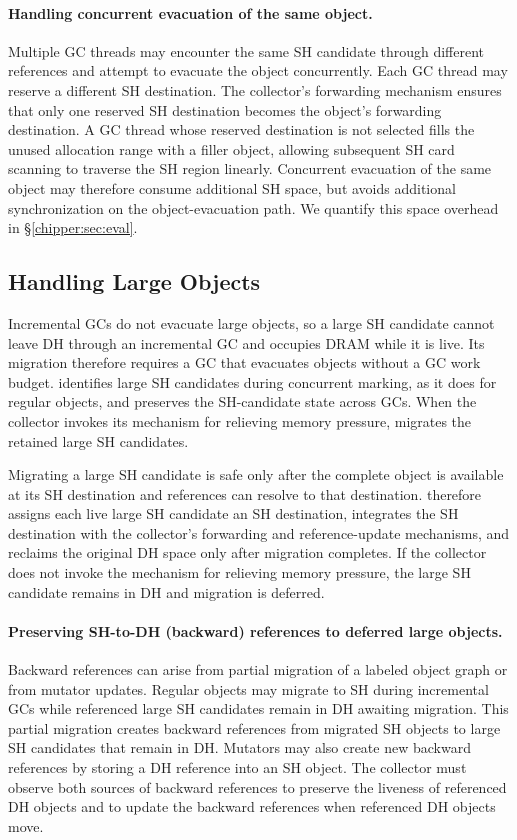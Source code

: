 \paragraph{\textbf{Handling concurrent evacuation of the same object.}}
Multiple GC threads may encounter the same SH candidate through different references and attempt to evacuate the object concurrently.
Each GC thread may reserve a different SH destination.
The collector's forwarding mechanism ensures that only one reserved SH destination becomes the object's forwarding destination.
A GC thread whose reserved destination is not selected fills the unused allocation range with a filler object, allowing subsequent SH card scanning to traverse the SH region linearly.
Concurrent evacuation of the same object may therefore consume additional SH space, but avoids additional synchronization on the object-evacuation path.
We quantify this space overhead in \S\ref{chipper:sec:eval}.

\subsection{Handling Large Objects}
\label{sec:nonmovable}

Incremental GCs do not evacuate large objects, so a large SH candidate cannot leave DH through an incremental GC and occupies DRAM while it is live.
Its migration therefore requires a GC that evacuates objects without a GC work budget.
\chipperName{} identifies large SH candidates during concurrent marking, as it does for regular objects, and preserves the SH-candidate state across GCs.
When the collector invokes its mechanism for relieving memory pressure, \chipperName{} migrates the retained large SH candidates.

Migrating a large SH candidate is safe only after the complete object is available at its SH destination and references can resolve to that destination.
\chipperName{} therefore assigns each live large SH candidate an SH destination, integrates the SH destination with the collector's forwarding and reference-update mechanisms, and reclaims the original DH space only after migration completes.
If the collector does not invoke the mechanism for relieving memory pressure, the large SH candidate remains in DH and migration is deferred.

\paragraph{\textbf{Preserving SH-to-DH (backward) references to deferred large objects.}}
Backward references can arise from partial migration of a labeled object graph or from mutator updates.
Regular objects may migrate to SH during incremental GCs while referenced large SH candidates remain in DH awaiting migration.
This partial migration creates backward references from migrated SH objects to large SH candidates that remain in DH.
Mutators may also create new backward references by storing a DH reference into an SH object.
The collector must observe both sources of backward references to preserve the liveness of referenced DH objects and to update the backward references when referenced DH objects move.

